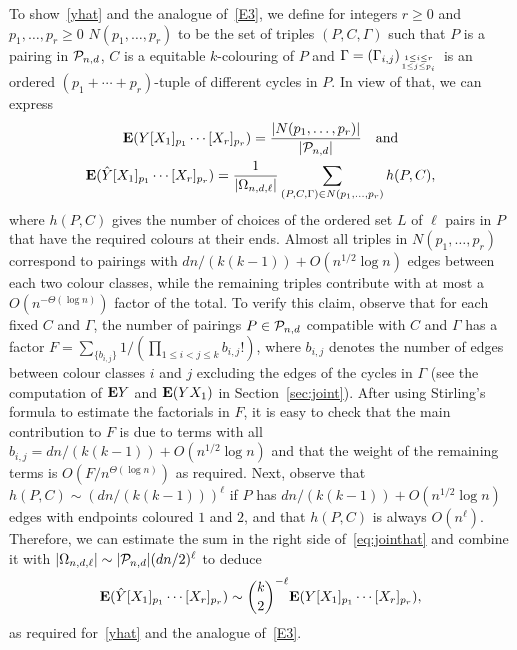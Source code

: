 \documentclass[12pt]{article}
\def\P{{\cal P}}
\def\ex{{\bf E}}
\def\Pnd{\P_{n,d}}
\begin{document}
To show~\eqref{yhat} and the analogue of~\eqref{E3}, we define for integers $r\ge0$ and $p_1,\ldots,p_r\ge0$
$N(p_1,\ldots,p_r)$ to be the set of triples $(P,C,\Gamma)$ such that $P$ is a pairing in $\Pnd$, $C$ is a equitable $k$-colouring of $P$ and $\Gamma=(\Gamma_{i,j})_{1\le i\le r\atop 1\le j\le p_i}$ is an ordered $(p_1+\cdots+p_r)$-tuple of different cycles in $P$. In view of that, we can express
%
\begin{gather}
\ex(Y[X_1]_{p_1}\cdots [X_r]_{p_r}) = \frac{|N(p_1,\ldots,p_r)|}{|\Pnd|}
\quad\text{and}
\notag\\
\ex(\hat Y[X_1]_{p_1}\cdots [X_r]_{p_r}) = \frac{1}{|\Omega_{n,d,\ell}|}
\sum_{(P,C,\Gamma)\in N(p_1,\ldots,p_r)} h(P,C),
\label{eq:jointhat}
\end{gather}
%
where $h(P,C)$ gives the number of choices of the ordered set $L$ of $\ell$ pairs in $P$ that have the required colours at their ends.
Almost all triples in $N(p_1,\ldots,p_r)$ correspond to pairings with $dn/(k(k-1)) + O(n^{1/2} \log n)$ edges between each two colour classes, while the remaining triples contribute with at most a $O(n^{-\Theta(\log n)})$ factor of the total.
To verify this claim, observe that for each fixed $C$ and $\Gamma$, the number of pairings $P\in\Pnd$ compatible with $C$ and $\Gamma$ has a factor $F=\sum_{\{b_{i,j}\}}1/(\prod_{1\le i<j\le k}b_{i,j}!)$, where $b_{i,j}$ denotes the number of edges between colour classes $i$ and $j$ excluding the edges of the cycles in $\Gamma$ (see the computation of $\ex Y$ and $\ex(YX_1)$ in Section~\ref{sec:joint}).
After using Stirling's formula to estimate the factorials in $F$, it is easy to check that the main contribution to $F$ is due to terms with all $b_{i,j} = dn/(k(k-1)) + O(n^{1/2} \log n)$ and that the weight of the remaining terms is $O(F / n^{\Theta(\log n)})$ as required.
Next, observe that $h(P,C)\sim (dn/(k(k-1)))^\ell$ if $P$ has $dn/(k(k-1)) + O(n^{1/2} \log n)$ edges with endpoints coloured $1$ and $2$, and that $h(P,C)$ is always $O(n^\ell)$. Therefore, we can estimate the sum in the right side of~\eqref{eq:jointhat} and combine it with $|\Omega_{n,d,\ell}|\sim|\Pnd|(dn/2)^\ell$ to deduce
\[
\ex(\hat Y[X_1]_{p_1}\cdots [X_r]_{p_r}) \sim \binom{k}{2}^{-\ell}
\ex(Y[X_1]_{p_1}\cdots [X_r]_{p_r}),
\]
as required for~\eqref{yhat} and the analogue of~\eqref{E3}.
\end{document}
